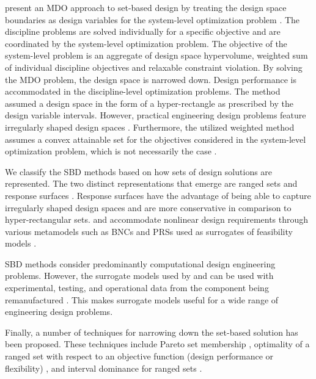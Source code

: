 \citeauthor{Hannapel2014} present an \ac{MDO} approach to set-based design by treating the design space boundaries as design variables for the system-level optimization problem \cite{Hannapel2014}. The discipline problems are solved individually for a specific objective and are coordinated by the system-level optimization problem. The objective of the system-level problem is an aggregate of design space hypervolume, weighted sum of individual discipline objectives and relaxable constraint violation. By solving the \ac{MDO} problem, the design space is narrowed down. Design performance is accommodated in the discipline-level optimization problems. The method assumed a design space in the form of a hyper-rectangle as prescribed by the design variable intervals. However, practical engineering design problems feature irregularly shaped design spaces \cite{Shahan2012}. Furthermore, the utilized weighted method assumes a convex attainable set for the objectives considered in the system-level optimization problem, which is not necessarily the case \cite{WardAthan1996}.

We classify the \ac{SBD} methods based on how sets of design solutions are represented. The two distinct representations that emerge are ranged sets \cite{Qureshi2014,Nahm2005,Olewnik2004,Liu2008,Suh2007} and response surfaces \cite{Kizer2014,Shahan2012,Yannou2003,Ge2005}. Response surfaces have the advantage of being able to capture irregularly shaped design spaces and are more conservative in comparison to hyper-rectangular sets. \citeauthor{Shahan2012} and \citeauthor{Yannou2003} accommodate nonlinear design requirements through various metamodels such as \acp{BNC} and \acp{PRS} used as surrogates of feasibility models \cite{Shahan2012,Yannou2003}.

\ac{SBD} methods consider predominantly computational design engineering problems. However, the surrogate models used by \citeauthor{Shahan2012} and \citeauthor{Yannou2003} can be used with experimental, testing, and operational data from the component being remanufactured \cite{Shahan2012,Yannou2003}. This makes surrogate models useful for a wide range of engineering design problems.

Finally, a number of techniques for narrowing down the set-based solution has been proposed. These techniques include Pareto set membership \cite{Olewnik2004,Miller2018}, optimality of a ranged set with respect to an objective function (design performance or flexibility) \cite{Hannapel2014,Liu2008,Suh2007}, and interval dominance for ranged sets \cite{Malak2009,Miller2018}.

